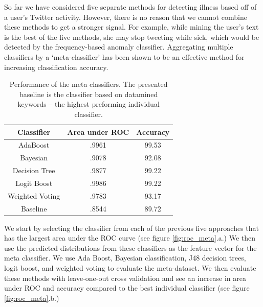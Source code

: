\documentclass{acm_proc_article-sp}
\begin{document}
So far we have considered five separate methods for detecting illness based off of a user's Twitter activity. However, there is no reason that we cannot combine these methods to get a stronger signal. For example, while mining the user's text is the best of the five methods, she may stop tweeting while sick, which would be detected by the frequency-based anomaly classifier. Aggregating multiple classifiers by a `meta-classifier' has been shown to be an effective method for increasing classification accuracy. \cite{Frossyniotis:2004wx,Todorovski:2003hk}

\begin{table}
\centering
\begin{tabular}{|c|c|c|} \hline
Classifier&Area under ROC& Accuracy \\ \hline
AdaBoost & .9961 & 99.53\\ \hline
Bayesian & .9078 &  92.08\\ \hline
Decision Tree & .9877 & 99.22\\ \hline
Logit Boost & .9986 & 99.22\\ \hline
Weighted Voting & .9783 & 93.17\\ \hline
Baseline & .8544 & 89.72\\ 
\hline\end{tabular}
\caption{Performance of the meta classifiers. The presented baseline is the classifier based on datamined keywords -- the highest preforming individual classifier.}
\label{tab:meta_results}
\end{table}

We start by selecting the classifier from each of the previous five approaches that has the largest area under the ROC curve (see figure \ref{fig:roc_meta}.a.) We then use the predicted distributions from these classifiers as the feature vector for the meta classifier. We use Ada Boost, Bayesian classification, J48 decision trees, logit boost, and weighted voting to evaluate the meta-dataset. We then evaluate these methods with leave-one-out cross validation and see an increase in area under ROC and accuracy compared to the best individual classifier (see figure \ref{fig:roc_meta}.b.)

\end{document}
